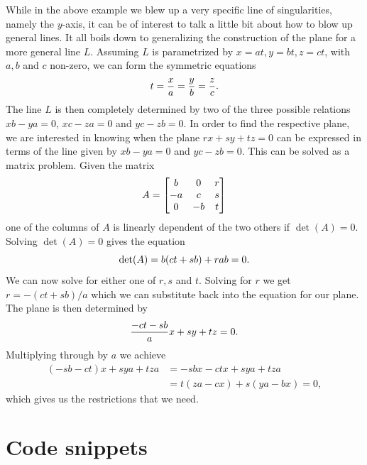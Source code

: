 \documentclass{article}
\begin{document}
    While in the above example we blew up a very specific line of
    singularities, namely the $y$-axis, it can be of interest to talk a little
    bit about how to blow up general lines. It all boils down to generalizing
    the construction of the plane for a more general line $L$. Assuming $L$ is
    parametrized by $x = at, y = bt, z = ct$, with $a, b$ and $c$ non-zero, we
    can form the symmetric equations 
    \begin{equation}
        \notag
        t = \frac{x}{a} = \frac{y}{b} = \frac{z}{c}.
    \end{equation}
    The line $L$ is then completely determined by two of the three possible
    relations $xb - ya = 0$, $xc - za = 0$ and $yc - zb = 0$.  In order to find
    the respective plane, we are interested in knowing when the plane $rx + sy
    + tz = 0$ can be expressed in terms of the line given by $xb - ya = 0$ and
    $yc - zb = 0$. This can be solved as a matrix problem. Given the matrix
    \begin{equation}
        \notag
        A = \begin{bmatrix}
            b & 0 & r \\
            -a & c & s \\
            0 & -b & t
        \end{bmatrix}
    \end{equation}
    one of the columns of $A$ is linearly dependent of the two others if
    $\det(A) = 0$. Solving $\det(A) = 0$ gives the equation
    \begin{equation}
        \notag
        \det(A) = b(ct + sb) + rab = 0.
    \end{equation}
    We can now solve for either one of $r, s$ and $t$. Solving for $r$ we get
    $r = -( ct + sb ) / a$ which we can substitute back into the equation for
    our plane.  The plane is then determined by 
    \begin{equation}
        \notag
        \frac{-ct - sb}{a}x + sy + tz = 0.
    \end{equation}
    Multiplying through by $a$ we achieve
    \begin{align*}
        (-sb - ct)x + sya + tza &= -sbx - ctx + sya + tza \\
                                &= t(za - cx) + s(ya - bx) = 0,
    \end{align*}
    which gives us the restrictions that we need.

    \clearpage 
    \appendix
    
    \section{Code snippets}
    \label{sec:code_snippets}
        
\end{document}
